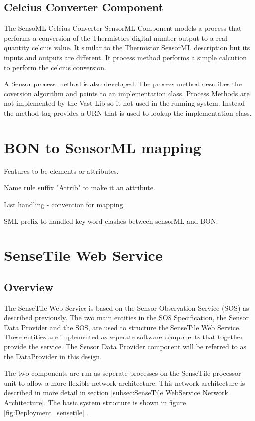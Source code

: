\documentclass[]{final_report}
\begin{document}
\subsection{Celcius Converter Component}

The SensoML Celcius Converter SensorML Component  models a process that performs a conversion of the Thermistors digital number output to a real quantity celcius value. It similar to the Thermistor SensorML description but its inputs and outputs are different. It process method performs a simple calcution to perform the celcius conversion.

A Sensor process method is also developed. The process method describes the coversion algorithm and points to an implementation class. Process Methods are not implemented by the Vast Lib so it not used in the running system. Instead the method tag provides a URN that is used to lookup the implementation class.

\section{BON to SensorML mapping}
Features to be elements or attributes.

Name rule suffix "Attrib" to make it an attribute.

List handling - convention for mapping.

SML prefix to handled key word clashes between sensorML and BON.


\section{SenseTile Web Service}
\subsection{Overview}

The SenseTile Web Service is based on the Sensor Observation Service (SOS) as described previously. The two main entities in the SOS Specification, the Sensor Data Provider and the SOS,  are used to structure the SenseTile Web Service. These entities are implemented as seperate software components that together provide the service. The Sensor Data Provider component will be referred to as the DataProvider in this design.

The two components are run as seperate processes on the SenseTile processor unit to allow a more flexible network architecture.  This network architecture is described in more detail in section \ref{subsec:SenseTile WebService Network Architecture}. The basic system structure is shown in figure \ref {fig:Deployment_sensetile} .
\end{document}
